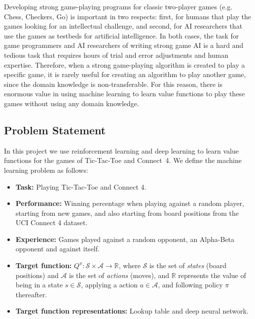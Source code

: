 \documentclass{article}
\begin{document}
Developing strong game-playing programs for classic two-player games (e.g. Chess, Checkers, Go) is
important in two respects: first, for humans that play the games looking for an intellectual
challenge, and second, for AI researchers that use the games as testbeds for artificial
intelligence. In both cases, the task for game programmers and AI researchers of writing strong game
AI is a hard and tedious task that requires hours of trial and error adjustments and human
expertise. Therefore, when a strong game-playing algorithm is created to play a specific game, it is
rarely useful for creating an algorithm to play another game, since the domain knowledge is
non-transferable. For this reason, there is enormous value in using machine learning to learn value
functions to play these games without using any domain knowledge.

\subsection{Problem Statement}
\label{sec:problem-statement}

\newcommand{\URLcf}{https://en.wikipedia.org/wiki/Connect_Four}

In this project we use reinforcement learning and deep learning to learn value functions for the
games of \mbox{Tic-Tac-Toe} and \mbox{Connect 4}. We define the machine learning problem as follows:

\begin{itemize}

    \item \textbf{Task:} Playing Tic-Tac-Toe and Connect 4.

    \item \textbf{Performance:} Winning percentage when playing against a random player, starting
        from new games, and also starting from board positions from the UCI Connect 4 dataset.

    \item \textbf{Experience:} Games played against a random opponent, an Alpha-Beta opponent and
        against itself.

    \item \textbf{Target function:} $Q^\pi : \mathcal{S} \times \mathcal{A} \to \mathbb{R}$, where
        $\mathcal{S}$ is the set of \emph{states} (board positions) and $\mathcal{A}$ is the set of
        \emph{actions} (moves), and $\mathbb{R}$ represents the value of being in a state $s \in
        \mathcal{S}$, applying a action $a \in \mathcal{A}$, and following policy $\pi$ thereafter.

    \item \textbf{Target function representations:} Lookup table and deep neural network.

\end{itemize}
\end{document}

